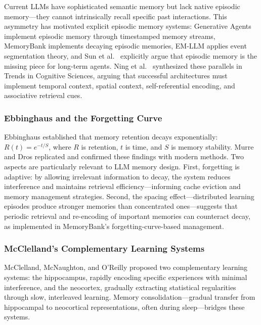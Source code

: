 \documentclass[11pt,letterpaper]{article}
\begin{document}
Current LLMs have sophisticated semantic memory but lack native episodic memory---they cannot intrinsically recall specific past interactions. This asymmetry has motivated explicit episodic memory systems: Generative Agents \cite{park2023generative} implement episodic memory through timestamped memory streams, MemoryBank \cite{zhong2024memorybank} implements decaying episodic memories, EM-LLM \cite{hu2025emllm} applies event segmentation theory, and Sun et al.\ \cite{sun2025episodic} explicitly argue that episodic memory is the missing piece for long-term agents. Ning et al.\ \cite{ning2025episodic} synthesized these parallels in Trends in Cognitive Sciences, arguing that successful architectures must implement temporal context, spatial context, self-referential encoding, and associative retrieval cues.

\subsubsection{Ebbinghaus and the Forgetting Curve}

Ebbinghaus \cite{ebbinghaus1885memory} established that memory retention decays exponentially: $R(t) = e^{-t/S}$, where $R$ is retention, $t$ is time, and $S$ is memory stability. Murre and Dros \cite{murre2015replication} replicated and confirmed these findings with modern methods. Two aspects are particularly relevant to LLM memory design. First, forgetting is adaptive: by allowing irrelevant information to decay, the system reduces interference and maintains retrieval efficiency---informing cache eviction and memory management strategies. Second, the spacing effect---distributed learning episodes produce stronger memories than concentrated ones---suggests that periodic retrieval and re-encoding of important memories can counteract decay, as implemented in MemoryBank's forgetting-curve-based management.

\subsubsection{McClelland's Complementary Learning Systems}

McClelland, McNaughton, and O'Reilly \cite{mcclelland1995complementary} proposed two complementary learning systems: the hippocampus, rapidly encoding specific experiences with minimal interference, and the neocortex, gradually extracting statistical regularities through slow, interleaved learning. Memory consolidation---gradual transfer from hippocampal to neocortical representations, often during sleep---bridges these systems.
\end{document}

